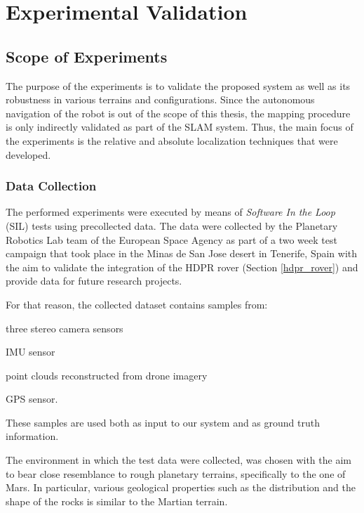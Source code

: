 \label{Chapter4}

\chapter{Experimental Validation}

\section{Scope of Experiments}

The purpose of the experiments is to validate the proposed system as
well as its robustness in various terrains and configurations.
Since the autonomous navigation of the robot is out of the scope of this
thesis, the mapping procedure is only indirectly validated as part of the
SLAM system.
Thus, the main focus of the experiments is the relative and absolute
localization techniques that were developed.

\subsection{Data Collection}

The performed experiments were executed by means of
\textit{Software In the Loop} (SIL) tests using precollected data.
The data were collected by the Planetary Robotics Lab team of the European
Space Agency as part of a two week test campaign that took
place in the Minas de San Jose desert in Tenerife, Spain with the aim to
validate the integration of the HDPR rover (Section \ref{hdpr_rover}) and
provide data for future research projects.

For that reason, the collected dataset contains samples from:
\begin{enumerate*}[label=(\roman*)]
        \item three stereo camera sensors
        \item IMU sensor
        \item point clouds reconstructed from drone imagery
        \item GPS sensor.
\end{enumerate*}
These samples are used both as input to our system and as ground truth
information.

The environment in which the test data were collected, was chosen with
the aim to bear close resemblance to rough planetary terrains,
specifically to the one of Mars.
In particular, various geological properties such as the distribution
and the shape of the rocks is similar to the Martian terrain.

